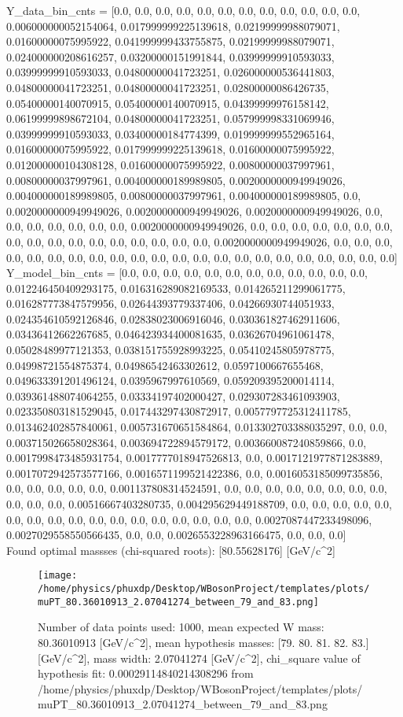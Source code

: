 \documentclass[12pt]{article}
\begin{document}
	Y_data_bin_cnts = [0.0, 0.0, 0.0, 0.0, 0.0, 0.0, 0.0, 0.0, 0.0, 0.0, 0.0, 0.0, 0.006000000052154064, 0.017999999225139618, 0.02199999988079071, 0.01600000075995922, 0.041999999433755875, 0.02199999988079071, 0.024000000208616257, 0.03200000151991844, 0.03999999910593033, 0.03999999910593033, 0.04800000041723251, 0.026000000536441803, 0.04800000041723251, 0.04800000041723251, 0.02800000086426735, 0.05400000140070915, 0.05400000140070915, 0.04399999976158142, 0.06199999898672104, 0.04800000041723251, 0.057999998331069946, 0.03999999910593033, 0.03400000184774399, 0.019999999552965164, 0.01600000075995922, 0.017999999225139618, 0.01600000075995922, 0.012000000104308128, 0.01600000075995922, 0.00800000037997961, 0.00800000037997961, 0.004000000189989805, 0.0020000000949949026, 0.004000000189989805, 0.00800000037997961, 0.004000000189989805, 0.0, 0.0020000000949949026, 0.0020000000949949026, 0.0020000000949949026, 0.0, 0.0, 0.0, 0.0, 0.0, 0.0, 0.0, 0.0020000000949949026, 0.0, 0.0, 0.0, 0.0, 0.0, 0.0, 0.0, 0.0, 0.0, 0.0, 0.0, 0.0, 0.0, 0.0, 0.0, 0.0, 0.0, 0.0020000000949949026, 0.0, 0.0, 0.0, 0.0, 0.0, 0.0, 0.0, 0.0, 0.0, 0.0, 0.0, 0.0, 0.0, 0.0, 0.0, 0.0, 0.0, 0.0, 0.0, 0.0, 0.0, 0.0]\\
	Y_model_bin_cnts = [0.0, 0.0, 0.0, 0.0, 0.0, 0.0, 0.0, 0.0, 0.0, 0.0, 0.0, 0.0, 0.012246450409293175, 0.016316289082169533, 0.014265211299061775, 0.016287773847579956, 0.02644393779337406, 0.04266930744051933, 0.024354610592126846, 0.02838023006916046, 0.030361827462911606, 0.03436412662267685, 0.046423934400081635, 0.03626704961061478, 0.05028489977121353, 0.038151755928993225, 0.05410245805978775, 0.04998721554875374, 0.04986542463302612, 0.0597100667655468, 0.049633391201496124, 0.0395967997610569, 0.059209395200014114, 0.039361488074064255, 0.03334197402000427, 0.029307283461093903, 0.023350803181529045, 0.017443297430872917, 0.0057797725312411785, 0.013462402857840061, 0.005731670651584864, 0.013302703388035297, 0.0, 0.0, 0.003715026658028364, 0.003694722894579172, 0.003660087240859866, 0.0, 0.0017998473485931754, 0.0017777018947526813, 0.0, 0.0017121977871283889, 0.0017072942573577166, 0.0016571199521422386, 0.0, 0.0016053185099735856, 0.0, 0.0, 0.0, 0.0, 0.0, 0.001137808314524591, 0.0, 0.0, 0.0, 0.0, 0.0, 0.0, 0.0, 0.0, 0.0, 0.0, 0.0, 0.00516667403280735, 0.004295629449188709, 0.0, 0.0, 0.0, 0.0, 0.0, 0.0, 0.0, 0.0, 0.0, 0.0, 0.0, 0.0, 0.0, 0.0, 0.0, 0.0, 0.0, 0.0027087447233498096, 0.0027029558550566435, 0.0, 0.0, 0.0026553228963166475, 0.0, 0.0, 0.0]\\

    Found optimal massses (chi-squared roots): [80.55628176] [GeV/c^2]

	\begin{figure}[tb]
		\centering
		\texttt{[image: /home/physics/phuxdp/Desktop/WBosonProject/templates/plots/muPT\_80.36010913\_2.07041274\_between\_79\_and\_83.png]}
		\caption{\small Number of data points used: 1000, mean expected W mass: 80.36010913 [GeV/c^2], mean hypothesis masses: [79. 80. 81. 82. 83.] [GeV/c^2], mass width: 2.07041274 [GeV/c^2], chi_square value of hypothesis fit: 0.00029114840214308296 from /home/physics/phuxdp/Desktop/WBosonProject/templates/plots/muPT_80.36010913_2.07041274_between_79_and_83.png }
		\label{fig: fig_0}
	\end{figure}
\end{document}
